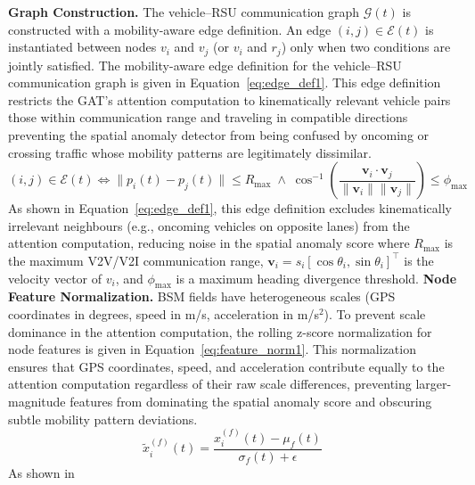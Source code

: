 \documentclass[12pt, a4paper]{report}
\begin{document}
\textbf{Graph Construction.}
The vehicle--RSU communication graph $\mathcal{G}(t)$ is constructed with
a mobility-aware edge definition. An edge $(i,j) \in \mathcal{E}(t)$ is
instantiated between nodes $v_i$ and $v_j$ (or $v_i$ and $r_j$) only when
two conditions are jointly satisfied. The mobility-aware edge definition
for the vehicle--RSU communication graph is given in
Equation~\ref{eq:edge_def1}.
\newline
\newline
This edge definition restricts the GAT's attention computation to
kinematically relevant vehicle pairs those within communication
range and traveling in compatible directions preventing the spatial
anomaly detector from being confused by oncoming or crossing traffic
whose mobility patterns are legitimately dissimilar.
\begin{equation}
  (i,j) \in \mathcal{E}(t) \iff
  \|p_i(t) - p_j(t)\| \leq R_{\max}
  \;\land\;
  \cos^{-1}\!\left(\frac{\mathbf{v}_i \cdot \mathbf{v}_j}
    {\|\mathbf{v}_i\|\|\mathbf{v}_j\|}\right) \leq \phi_{\max}
  \label{eq:edge_def1}
\end{equation}
As shown in Equation~\ref{eq:edge_def1}, this edge definition
excludes kinematically irrelevant neighbours (e.g., oncoming vehicles on
opposite lanes) from the attention computation, reducing noise in the
spatial anomaly score where $R_{\max}$ is the maximum V2V/V2I communication range,
$\mathbf{v}_i = s_i[\cos\theta_i, \sin\theta_i]^\top$ is the velocity
vector of $v_i$, and $\phi_{\max}$ is a maximum heading divergence
threshold.
\newline
\newline
\textbf{Node Feature Normalization.}
BSM fields have heterogeneous scales (GPS coordinates in degrees, speed
in m/s, acceleration in m/s$^2$). To prevent scale dominance in the
attention computation, the rolling z-score normalization for node features
is given in Equation~\ref{eq:feature_norm1}.
\newline
\newline
This normalization ensures that GPS coordinates, speed, and
acceleration contribute equally to the attention computation
regardless of their raw scale differences, preventing larger-magnitude
features from dominating the spatial anomaly score and obscuring
subtle mobility pattern deviations.
\begin{equation}
  \tilde{x}_i^{(f)}(t) = \frac{x_i^{(f)}(t) - \mu_f(t)}{\sigma_f(t) + \epsilon}
  \label{eq:feature_norm1}
\end{equation}
As shown in
\end{document}
